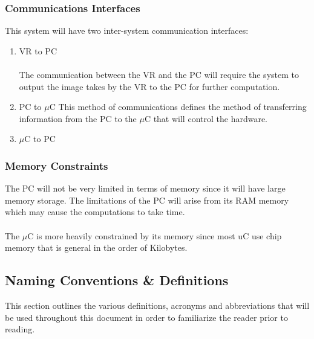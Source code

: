 \documentclass[titlepage]{article}
\begin{document}
\subsubsection{Communications Interfaces}
This system will have two inter-system communication interfaces:
\begin{enumerate}
	\item VR to PC\\\\
	The communication between the VR and the PC will require the system to output the image takes by the VR to the PC for further computation.
	\item PC to $\mu$C
	This method of communications defines the method of transferring information from the PC to the $\mu$C that will control the hardware.
	\item $\mu$C to PC
\end{enumerate}
\subsubsection{Memory Constraints}
The PC will not be very limited in terms of memory since it will have large memory storage. The limitations of the PC will arise from its RAM memory which may cause the computations to take time.\\\\
The $\mu$C is more heavily constrained by its memory since most uC use chip memory that is general in the order of Kilobytes.
 
\subsection{Naming Conventions \& Definitions}
This section outlines the various definitions, acronyms and abbreviations that will be used throughout this document in order to familiarize the reader prior to reading.
\end{document}
